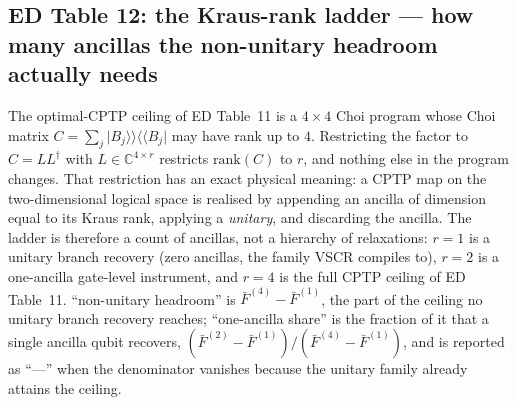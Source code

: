 \documentclass[10pt,a4paper]{article}
\begin{document}
\subsection*{ED Table 12: the Kraus-rank ladder --- how many ancillas the
non-unitary headroom actually needs}
The optimal-CPTP ceiling of ED Table~11 is a $4\times4$ Choi program whose Choi
matrix $C=\sum_j\lvert B_j\rangle\!\rangle\langle\!\langle B_j\rvert$ may have
rank up to $4$.  Restricting the factor to $C=LL^\dagger$ with
$L\in\mathbb C^{4\times r}$ restricts $\mathrm{rank}(C)$ to $r$, and nothing else
in the program changes.  That restriction has an exact physical meaning: a CPTP
map on the two-dimensional logical space is realised by appending an ancilla of
dimension equal to its Kraus rank, applying a \emph{unitary}, and discarding the
ancilla.  The ladder is therefore a count of ancillas, not a hierarchy of
relaxations: $r{=}1$ is a unitary branch recovery (zero ancillas, the family
VSCR compiles to), $r{=}2$ is a one-ancilla gate-level instrument, and $r{=}4$ is
the full CPTP ceiling of ED Table~11.  ``non-unitary headroom'' is
$\bar F^{(4)}-\bar F^{(1)}$, the part of the ceiling no unitary branch recovery
reaches; ``one-ancilla share'' is the fraction of it that a single ancilla qubit
recovers, $(\bar F^{(2)}-\bar F^{(1)})/(\bar F^{(4)}-\bar F^{(1)})$, and is
reported as ``---'' when the denominator vanishes because the unitary family
already attains the ceiling.
\end{document}
